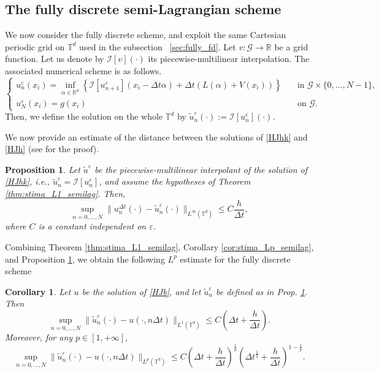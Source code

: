 \documentclass[11pt]{amsart}
\newtheorem{prop}[thm]{Proposition}
\newtheorem{cor}[thm]{Corollary}
\theoremstyle{remark}
\theoremstyle{definition}
\theoremstyle{Claim}
\newcommand{\T}{{\mathbb{T}}}
\newcommand{\R}{\mathbb{R}}
\newcommand{\mI}{\mathcal I}
\theoremstyle{plain}
\newcommand{\dt}{{\Delta t}}
\begin{document}
\subsection{The fully discrete semi-Lagrangian scheme}
We now consider the fully discrete scheme, and exploit the same Cartesian periodic grid on $\mathbb{T}^d$ used in the subsection ~\ref{sec:fully_fd}. Let $v:\mathcal{G}\to \mathbb{R}$ be a grid function. Let us denote by $\mathcal{I}[v](\cdot)$ its piecewise-multilinear interpolation. The associated numerical scheme is as follows. 
\begin{equation}\label{HJhk}
\left\{
\begin{array}{ll}
u^\varepsilon_n(x_i)=\inf_{\alpha\in \R^{d}}\left\{\mathcal{I}[u^\varepsilon_{n+1}](x_i-\dt\alpha)+ \dt (L( \alpha)+V(x_i))\right\} \quad & \text{in }\mathcal{G}\times\{0,\dots,N-1\},\\[6pt]
u^\varepsilon_N(x_i)= g(x_i) & \text{on }\mathcal{G}.
\end{array}
\right.
\end{equation}
Then, we define the solution on the whole $\mathbb{T}^d$ by $\tilde u_n^\varepsilon(\cdot) := \mathcal{I}[u^\varepsilon_n](\cdot)$.


We now provide an estimate of the distance between the solutions of \eqref{HJhk} and \eqref{HJh} (see \cite{cfm} for the proof).
\begin{prop}\label{prop:stima_semi_fully_semilag} Let $\tilde u^{\varepsilon}$ be the piecewise-multilinear interpolant of the solution of \eqref{HJhk}, i.e., $\tilde u^{\varepsilon}_n =\mI[u^\varepsilon_n]
	$, and assume the hypotheses of Theorem \ref{thm:stima_L1_semilag}. Then,
	\begin{equation*}
		\sup_{n=0,\dots,N}\|u_n^\dt(\cdot) - \tilde u_n^{\varepsilon}(\cdot)\|_{L^\infty(\T^d)} \le C\frac{h}{\dt},
	\end{equation*}
	where $C$ is a constant independent on $\varepsilon$.
\end{prop}
Combining Theorem \ref{thm:stima_L1_semilag}, Corollary \ref{cor:stima_Lp_semilag}, and Proposition \ref{prop:stima_semi_fully_semilag}, we obtain the following $L^p$ estimate for the fully discrete scheme

\begin{cor}
	Let $u$ be the solution of \eqref{HJb}, and let $\tilde u_n^\varepsilon$ be defined as in  Prop. \ref{prop:stima_semi_fully_semilag}. Then
	\begin{equation*}
		\sup_{n=0,\dots,N}\big\| \tilde u_n^\varepsilon(\cdot)-u(\cdot,n\Delta t)\big\|_{L^1(\T^d)} \le C\left(\dt+\frac{h}{\dt}\right).
	\end{equation*}
	Moreover, for any $p\in [1,+\infty]$,
	\[
	\sup_{n=0,\dots,N}\|\tilde u_n^\varepsilon(\cdot)-u(\cdot,n\Delta t)\|_{L^p(\T^d)}\leq C\left(\dt+\frac{h}{\dt}\right)^{\frac{1}{p}}\left(\dt^\frac 12+\frac{h}{\dt}\right)^{1-\frac{1}{p}}.
	\]
	
\end{cor}
\end{document}
